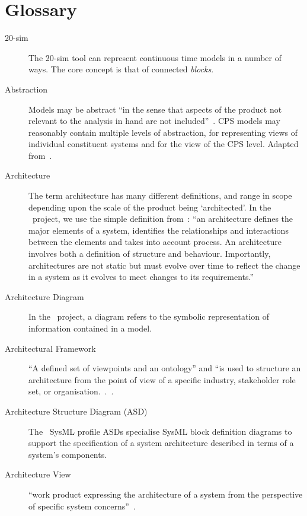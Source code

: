 \chapter{Glossary}
\label{sec:glossary}
\label{app:concepts}
\begin{description}

\item[20-sim] The 20-sim tool can represent continuous time models in a number of ways. The core concept is that of connected \emph{blocks}.

\item[Abstraction] Models may be abstract ``in the sense that aspects of the product not relevant to the analysis in hand are not included''~\cite{Fitzgerald&98b}. CPS models may reasonably contain multiple levels of abstraction, for representing views of individual constituent systems and for the view of the CPS level.  Adapted from~\cite{Holt&14}.

\item[Architecture] The term architecture has many different definitions, and range in scope depending upon the scale of the product being `architected'. In the \into\ project, we use the simple definition from~\cite{COMPASSD22.6}:  ``an architecture defines the major elements of a system, identifies the relationships and interactions between the elements and takes into account process. An architecture involves both a definition of structure and behaviour. Importantly, architectures are not static but must evolve over time to reflect the change in a system as it evolves to meet changes to its requirements.''

\item[Architecture Diagram] In the \into\ project, a diagram refers to the symbolic representation of information contained in a model.

\item[Architectural Framework] ``A defined set of viewpoints and an ontology'' and ``is used to structure an architecture from the point of view of a specific industry, stakeholder role set, or organisation.~\cite{Holt&14}.~\cite{Holt&14}.

\item[Architecture Structure Diagram (ASD)] The \into\ SysML profile ASDs specialise SysML block definition diagrams to support the specification of a system architecture described in terms of a system's components.

\item[Architecture View] ``work product expressing the architecture of a system from the perspective of specific system concerns''~\cite{COMPASSD22.6}.


\end{description}
